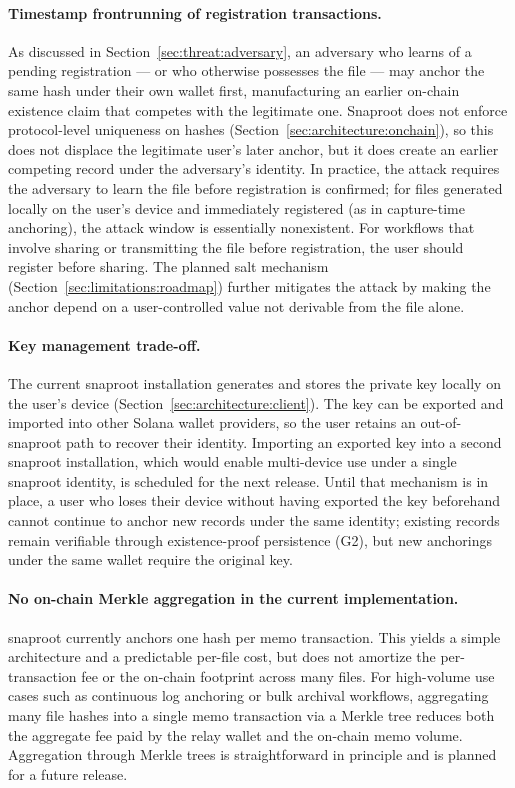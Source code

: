 \documentclass[11pt,a4paper]{article}
\begin{document}
\paragraph{Timestamp frontrunning of registration transactions.} As
discussed in Section~\ref{sec:threat:adversary}, an adversary who
learns of a pending registration --- or who otherwise possesses the
file --- may anchor the same hash under their own wallet first,
manufacturing an earlier on-chain existence claim that competes with
the legitimate one. Snaproot does not enforce protocol-level
uniqueness on hashes (Section~\ref{sec:architecture:onchain}), so this
does not displace the legitimate user's later anchor, but it does
create an earlier competing record under the adversary's identity. In
practice, the attack requires the adversary to learn the file before
registration is confirmed; for files generated locally on the user's
device and immediately registered (as in capture-time anchoring), the
attack window is essentially nonexistent. For workflows that involve
sharing or transmitting the file before registration, the user should
register before sharing. The planned salt mechanism
(Section~\ref{sec:limitations:roadmap}) further mitigates the attack
by making the anchor depend on a user-controlled value not derivable
from the file alone.

\paragraph{Key management trade-off.} The current snaproot installation
generates and stores the private key locally on the user's device
(Section~\ref{sec:architecture:client}). The key can be exported and
imported into other Solana wallet providers, so the user retains an
out-of-snaproot path to recover their identity. Importing an exported
key into a second snaproot installation, which would enable
multi-device use under a single snaproot identity, is scheduled for
the next release. Until that mechanism is in place, a user who loses
their device without having exported the key beforehand cannot
continue to anchor new records under the same identity; existing
records remain verifiable through existence-proof persistence (G2),
but new anchorings under the same wallet require the original key.

\paragraph{No on-chain Merkle aggregation in the current implementation.}
snaproot currently anchors one hash per memo transaction. This yields
a simple architecture and a predictable per-file cost, but does not
amortize the per-transaction fee or the on-chain footprint across many
files. For high-volume use cases such as continuous log anchoring or
bulk archival workflows, aggregating many file hashes into a single
memo transaction via a Merkle tree reduces both the aggregate fee paid
by the relay wallet and the on-chain memo volume. Aggregation through
Merkle trees is straightforward in principle and is planned for
a future release.
\end{document}
